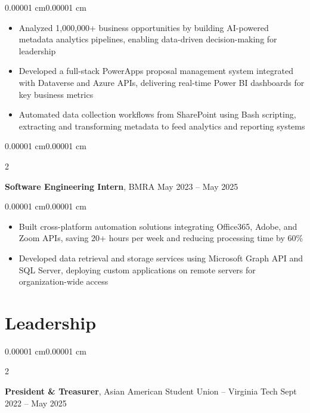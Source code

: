 \documentclass[10pt, letterpaper]{article}
\newenvironment{highlights}{
    \begin{itemize}[
        topsep=0.05 cm,
        parsep=0.05 cm,
        partopsep=0pt,
        itemsep=0pt,
        leftmargin=10pt
    ]
}{
    \end{itemize}
}
\newenvironment{onecolentry}{
    \begin{adjustwidth}{0.00001 cm}{0.00001 cm}
}{
    \end{adjustwidth}
}
\newenvironment{twocolentry}[2][]{
    \onecolentry
    \def\secondColumn{#2}
    \setcolumnwidth{\fill, 4.5 cm}
    \begin{paracol}{2}
}{
    \switchcolumn \raggedleft \secondColumn
    \end{paracol}
    \endonecolentry
}
\begin{document}
        \vspace{0.05 cm}
        \begin{onecolentry}
            \begin{highlights}
                \item Analyzed 1,000,000+ business opportunities by building AI-powered metadata analytics pipelines, enabling data-driven decision-making for leadership
                \item Developed a full-stack PowerApps proposal management system integrated with Dataverse and Azure APIs, delivering real-time Power BI dashboards for key business metrics
                \item Automated data collection workflows from SharePoint using Bash scripting, extracting and transforming metadata to feed analytics and reporting systems
            \end{highlights}
        \end{onecolentry}

        \vspace{0.1 cm}

        \begin{twocolentry}{
            May 2023 -- May 2025
        }
            \textbf{Software Engineering Intern}, BMRA\end{twocolentry}

        \vspace{0.05 cm}
        \begin{onecolentry}
            \begin{highlights}
                \item Built cross-platform automation solutions integrating Office365, Adobe, and Zoom APIs, saving 20+ hours per week and reducing processing time by 60\%
                \item Developed data retrieval and storage services using Microsoft Graph API and SQL Server, deploying custom applications on remote servers for organization-wide access
            \end{highlights}
        \end{onecolentry}


    \section{Leadership}

        \begin{twocolentry}{
            Sept 2022 -- May 2025
        }
            \textbf{President \& Treasurer}, Asian American Student Union -- Virginia Tech\end{twocolentry}
\end{document}
